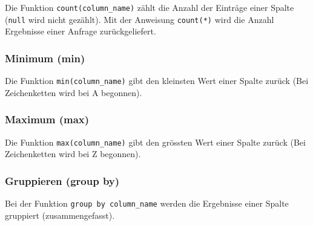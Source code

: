 Die Funktion \verb|count(column_name)| zählt die Anzahl der Einträge einer Spalte (\verb|null| wird nicht gezählt). Mit der Anweisung \verb|count(*)| wird die Anzahl Ergebnisse einer Anfrage zurückgeliefert.

\subsubsection{Minimum (min)}

Die Funktion \verb|min(column_name)| gibt den kleinsten Wert einer Spalte zurück (Bei Zeichenketten wird bei A begonnen).

\subsubsection{Maximum (max)}

Die Funktion \verb|max(column_name)| gibt den grössten Wert einer Spalte zurück (Bei Zeichenketten wird bei Z begonnen).

\subsubsection{Gruppieren (group by)}

Bei der Funktion \verb|group by column_name| werden die Ergebnisse einer Spalte gruppiert (zusammengefasst).